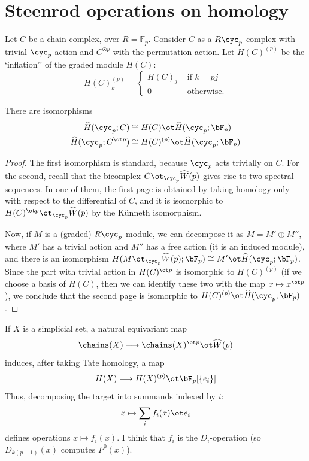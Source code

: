 \section{Steenrod operations on homology}

Let $C$ be a chain complex, over $R = \mathbb{F}_p$. Consider $C$ as a $R\cyc_p$-complex with trivial $\cyc_p$-action and $C^{\otimes p}$ with the permutation action. Let $H(C)^{(p)}$ be the `inflation'' of the graded module $H(C)$:
\[
H(C)^{(p)}_k = \begin{cases}
	H(C)_j & \text{ if $k = pj$} \\
	0 & \text{ otherwise.}
\end{cases}
\]
\begin{lemma}
	There are isomorphisms 
	\begin{align*}
		\widehat{H}(\cyc_p;C)&\cong H(C)\ot \widehat{H}(\cyc_p;\bF_p)
		\\
		\widehat{H}(\cyc_p;C^{\ot p}) & \cong H(C)^{(p)}\ot \widehat{H}(\cyc_p;\bF_p) 
	\end{align*}
\end{lemma}
\begin{proof}
	The first isomorphism is standard, because $\cyc_p$ acts trivially on $C$. For the second, recall that the bicomplex $C\ot_{\cyc_p} \widehat{W}(p)$ gives rise to two spectral sequences. In one of them, the first page is obtained by taking homology only with respect to the differential of $C$, and it is isomorphic to $H(C)^{\ot p}\ot_{\cyc_p} \widehat{W}(p)$ by the Künneth isomorphism.

	Now, if $M$ is a (graded) $R\cyc_p$-module, we can decompose it as $M = M'\oplus M''$, where $M'$ has a trivial action and $M''$ has a free action (it is an induced module), and there is an isomorphism $H(M\ot_{\cyc_p} \widehat{W}(p);\bF_p)\cong M^\prime\ot\widehat{H}(\cyc_p;\bF_p)$. 
Since the part with trivial action in $H(C)^{\ot p}$ is isomorphic to $H(C)^{(p)}$ (if we choose a basis of $H(C)$, then we can identify these two with the map $x\mapsto x^{\ot p}$), we conclude that the second page is isomorphic to $H(C)^{(p)}\ot \widehat{H}(\cyc_p;\bF_p)$. 
\end{proof}

If $X$ is a simplicial set, a natural equivariant map
\[
\chains(X)\longrightarrow \chains(X)^{\ot p}\ot \widehat{W}(p)
\]
induces, after taking Tate homology, a map
\[
H(X)\longrightarrow H(X)^{(p)}\ot \bF_p[\{e_i\}]
\]
Thus, decomposing the target into summands indexed by $i$:
\[
x\mapsto \sum_i f_i(x)\ot e_i
\]
defines operations $x\mapsto f_i(x)$. I think that $f_i$ is the $D_i$-operation (so $D_{k(p-1)}(x)$ computes $P^0(x)$).